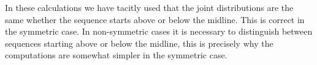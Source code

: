 \normalsize


In these calculations we have tacitly used that the joint distributions are the same whether the sequence starts above or below the midline. This is correct in the symmetric case. In non-symmetric cases it is necessary to distinguish between sequences starting above or below the midline, this is precisely why the computations are somewhat simpler in the symmetric case.






\address{Tore Wentzel-Larsen\\
  Centre for Child and Adolescent Mental Health, Eastern and Southern Norway\\
  Norwegian Centre of Violence and Traumatic Stress Studies \\
  Norway\\
  }

\address{Jacob Anh{\o}j\\
  Rigshospitalet, University of Copenhagen\\
  Denmark\\
  (ORCiD  https://orcid.org/0000-0002-7701-1774)\\
  }


